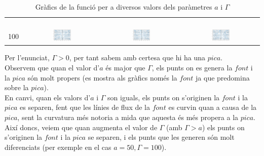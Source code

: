 \documentclass[a4paper, 11pt]{article}
\begin{document}
\begin{table}[h]
\begin{tabular}{c | c | c | c }
        &&&\\
        &&&\\
        &&&\\
        &&&\\\hline\hline
        \multirow{5}{*}{100} &  \multirow{5}{*}{\includegraphics[width=0.25\textwidth]{a100_t1.png}} & \multirow{5}{*}{\includegraphics[width=0.25\textwidth]{a100_t50.png} }& \multirow{5}{*}{\includegraphics[width=0.25\textwidth]{a100_t100.png}} \\  
        &&&\\
        &&&\\
        &&&\\
        &&&\\
    \end{tabular}
    \caption{Gràfics de la funció per a diversos valors dels paràmetres $a$ i $\Gamma$}
    \label{17}
\end{table}
Per l'enunciat, $\Gamma > 0$, per tant sabem amb certesa que hi ha una $pica$.\\
Observem que quan el valor d'$a$ és major que $\Gamma$, els punts on es genera la $font$ i la $pica$ són molt propers (es mostra als gràfics només la $font$ ja que predomina sobre la $pica$).\\
En canvi, quan els valors d'$a$ i $\Gamma$ son iguals, els punts on s'originen la $font$ i la $pica$ es separen, fent que les línies de flux de la $font$ es curvin quan a causa de la $pica$, sent la curvatura més notoria a mida que aquesta és més propera a la $pica$.\\
Així doncs, veiem que quan augmenta el valor de $\Gamma$ (amb $\Gamma>a$) els punts on s'originen la $font$ i la $pica$ se separen, i els punts que les generen són molt diferenciats (per exemple en el cas $a=50, \Gamma=100$).\\
\end{document}
